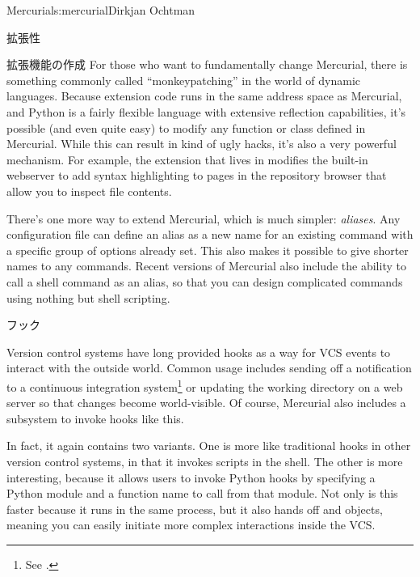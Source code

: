 \begin{aosachapter}{Mercurial}{s:mercurial}{Dirkjan Ochtman}
\begin{aosasect1}{拡張性}
\begin{aosasect2}{拡張機能の作成}
For those who want to fundamentally change Mercurial, there is
something commonly called ``monkeypatching'' in the world of dynamic
languages. Because extension code runs in the same address space as
Mercurial, and Python is a fairly flexible language with extensive
reflection capabilities, it's possible (and even quite easy) to modify
any function or class defined in Mercurial. While this can result in
kind of ugly hacks, it's also a very powerful mechanism. For example,
the  extension that lives in  modifies the
built-in webserver to add syntax highlighting to pages in the
repository browser that allow you to inspect file contents.

There's one more way to extend Mercurial, which is much simpler:
\emph{aliases}. Any configuration file can define an alias as a new
name for an existing command with a specific group of options already
set. This also makes it possible to give shorter names to any
commands. Recent versions of Mercurial also include the ability to
call a shell command as an alias, so that you can design complicated
commands using nothing but shell scripting.

\end{aosasect2}

\begin{aosasect2}{フック}

Version control systems have long provided hooks as a way for VCS
events to interact with the outside world. Common usage includes
sending off a notification to a continuous integration
system\footnote{See .} or updating the
working directory on a web server so that changes become
world-visible. Of course, Mercurial also includes a subsystem to
invoke hooks like this.

In fact, it again contains two variants. One is more like traditional
hooks in other version control systems, in that it invokes scripts in
the shell. The other is more interesting, because it allows users to
invoke Python hooks by specifying a Python module and a function name
to call from that module. Not only is this faster because it runs in
the same process, but it also hands off  and  objects, meaning
you can easily initiate more complex interactions inside the VCS.


\end{aosasect2}
\end{aosasect1}
\end{aosachapter}

